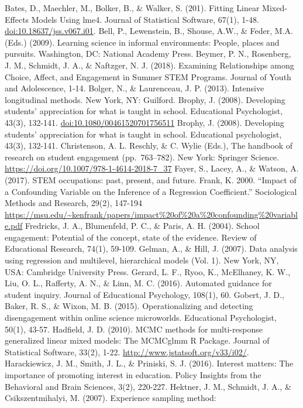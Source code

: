 \documentclass[man]{apa6}
\theoremstyle{definition}
\theoremstyle{definition}
\theoremstyle{definition}
\theoremstyle{remark}
\begin{document}
Bates, D., Maechler, M., Bolker, B., \& Walker, S. (201). Fitting Linear
Mixed-Effects Models Using lme4. Journal of Statistical Software, 67(1),
1-48. \url{doi:10.18637/jss.v067.i01}. Bell, P., Lewenstein, B., Shouse,
A.W., \& Feder, M.A. (Eds.) (2009). Learning science in informal
environments: People, places and pursuits. Washington, DC: National
Academy Press. Beymer, P. N., Rosenberg, J. M., Schmidt, J. A., \&
Naftzger, N. J. (2018). Examining Relationships among Choice, Affect,
and Engagement in Summer STEM Programs. Journal of Youth and
Adolescence, 1-14. Bolger, N., \& Laurenceau, J. P. (2013). Intensive
longitudinal methods. New York, NY: Guilford. Brophy, J. (2008).
Developing students' appreciation for what is taught in school.
Educational Psychologist, 43(3), 132-141.
\url{doi:10.1080/00461520701756511} Brophy, J. (2008). Developing
students' appreciation for what is taught in school. Educational
psychologist, 43(3), 132-141. Christenson, A. L. Reschly, \& C. Wylie
(Eds.), The handbook of research on student engagement (pp.~763--782).
New York: Springer Science.
\url{https://doi.org/10.1007/978-1-4614-2018-7_37} Fayer, S., Lacey, A.,
\& Watson, A. (2017). STEM occupations: past, present, and future.
Frank, K. 2000. \enquote{Impact of a Confounding Variable on the
Inference of a Regression Coefficient.} Sociological Methods and
Research, 29(2), 147-194
\url{https://msu.edu/~kenfrank/papers/impact\%20of\%20a\%20confounding\%20variable.pdf}
Fredricks, J. A., Blumenfeld, P. C., \& Paris, A. H. (2004). School
engagement: Potential of the concept, state of the evidence. Review of
Educational Research, 74(1), 59-109. Gelman, A., \& Hill, J. (2007).
Data analysis using regression and multilevel, hierarchical models (Vol.
1). New York, NY, USA: Cambridge University Press. Gerard, L. F., Ryoo,
K., McElhaney, K. W., Liu, O. L., Rafferty, A. N., \& Linn, M. C.
(2016). Automated guidance for student inquiry. Journal of Educational
Psychology, 108(1), 60. Gobert, J. D., Baker, R. S., \& Wixon, M. B.
(2015). Operationalizing and detecting disengagement within online
science microworlds. Educational Psychologist, 50(1), 43-57. Hadfield,
J. D. (2010). MCMC methods for multi-response generalized linear mixed
models: The MCMCglmm R Package. Journal of Statistical Software, 33(2),
1-22. \url{http://www.jstatsoft.org/v33/i02/}. Harackiewicz, J. M.,
Smith, J. L., \& Priniski, S. J. (2016). Interest matters: The
importance of promoting interest in education. Policy Insights from the
Behavioral and Brain Sciences, 3(2), 220-227. Hektner, J. M., Schmidt,
J. A., \& Csikszentmihalyi, M. (2007). Experience sampling method:
\end{document}
